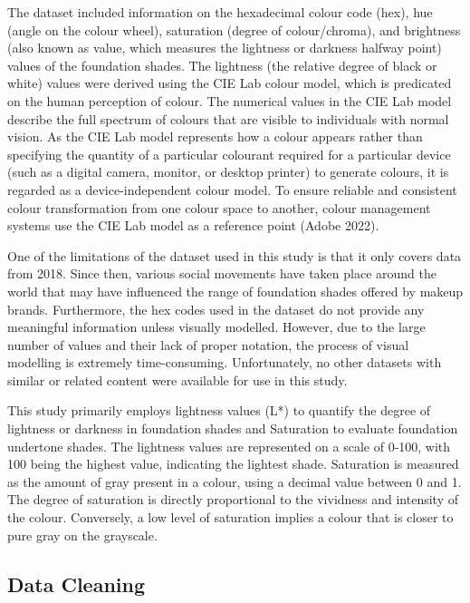 \documentclass[
  letterpaper,
  DIV=11,
  numbers=noendperiod]{scrartcl}
\begin{document}
The dataset included information on the hexadecimal colour code (hex),
hue (angle on the colour wheel), saturation (degree of colour/chroma),
and brightness (also known as value, which measures the lightness or
darkness halfway point) values of the foundation shades. The lightness
(the relative degree of black or white) values were derived using the
CIE Lab colour model, which is predicated on the human perception of
colour. The numerical values in the CIE Lab model describe the full
spectrum of colours that are visible to individuals with normal vision.
As the CIE Lab model represents how a colour appears rather than
specifying the quantity of a particular colourant required for a
particular device (such as a digital camera, monitor, or desktop
printer) to generate colours, it is regarded as a device-independent
colour model. To ensure reliable and consistent colour transformation
from one colour space to another, colour management systems use the CIE
Lab model as a reference point (Adobe 2022).

One of the limitations of the dataset used in this study is that it only
covers data from 2018. Since then, various social movements have taken
place around the world that may have influenced the range of foundation
shades offered by makeup brands. Furthermore, the hex codes used in the
dataset do not provide any meaningful information unless visually
modelled. However, due to the large number of values and their lack of
proper notation, the process of visual modelling is extremely
time-consuming. Unfortunately, no other datasets with similar or related
content were available for use in this study.

This study primarily employs lightness values (L*) to quantify the
degree of lightness or darkness in foundation shades and Saturation to
evaluate foundation undertone shades. The lightness values are
represented on a scale of 0-100, with 100 being the highest value,
indicating the lightest shade. Saturation is measured as the amount of
gray present in a colour, using a decimal value between 0 and 1. The
degree of saturation is directly proportional to the vividness and
intensity of the colour. Conversely, a low level of saturation implies a
colour that is closer to pure gray on the grayscale.

\hypertarget{data-cleaning}{%
\subsection{Data Cleaning}\label{data-cleaning}}
\end{document}
